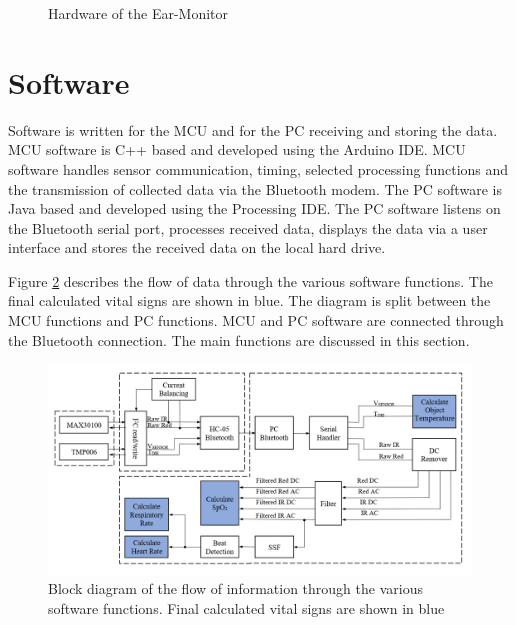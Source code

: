 \begin{figure}[H]
\centering
\graphicspath{{figs/}}

\caption{Hardware of the Ear-Monitor}
\label{fig:HardwarePhoto}
\end{figure}





\section{Software}
Software is written for the MCU and for the PC receiving and storing the data. MCU software is C++ based and developed using the Arduino IDE. MCU software handles sensor communication, timing, selected processing functions and the transmission of collected data via the Bluetooth modem. The PC software is Java based and developed using the Processing IDE. The PC software listens on the Bluetooth serial port, processes received data, displays the data via a user interface and stores the received data on the local hard drive.

\medskip

Figure \ref{fig:Software_BlockDiagram} describes the flow of data through the various software functions. The final calculated vital signs are shown in blue. The diagram is split between the MCU functions and PC functions. MCU and PC software are connected through the Bluetooth connection. The main functions are discussed in this section.

\begin{figure}[H]
   \centering
   \includegraphics[scale=0.45]{figs/Software_BlockDiagram.png}
   \caption{Block diagram of the flow of information through the various software functions. Final calculated vital signs are shown in blue}
   \label{fig:Software_BlockDiagram}
\end{figure}

